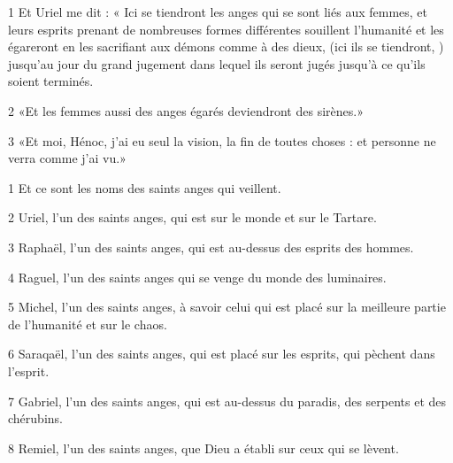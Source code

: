 
\par 1 Et Uriel me dit : « Ici se tiendront les anges qui se sont liés aux femmes, et leurs esprits prenant de nombreuses formes différentes souillent l'humanité et les égareront en les sacrifiant aux démons comme à des dieux, (ici ils se tiendront, ) jusqu'au jour du grand jugement dans lequel ils seront jugés jusqu'à ce qu'ils soient terminés.
\par 2 «Et les femmes aussi des anges égarés deviendront des sirènes.»
\par 3 «Et moi, Hénoc, j'ai eu seul la vision, la fin de toutes choses : et personne ne verra comme j'ai vu.»


\par 1 Et ce sont les noms des saints anges qui veillent.
\par 2 Uriel, l'un des saints anges, qui est sur le monde et sur le Tartare.
\par 3 Raphaël, l'un des saints anges, qui est au-dessus des esprits des hommes.
\par 4 Raguel, l'un des saints anges qui se venge du monde des luminaires.
\par 5 Michel, l'un des saints anges, à savoir celui qui est placé sur la meilleure partie de l'humanité et sur le chaos.
\par 6 Saraqaël, l'un des saints anges, qui est placé sur les esprits, qui pèchent dans l'esprit.
\par 7 Gabriel, l'un des saints anges, qui est au-dessus du paradis, des serpents et des chérubins.
\par 8 Remiel, l'un des saints anges, que Dieu a établi sur ceux qui se lèvent.


